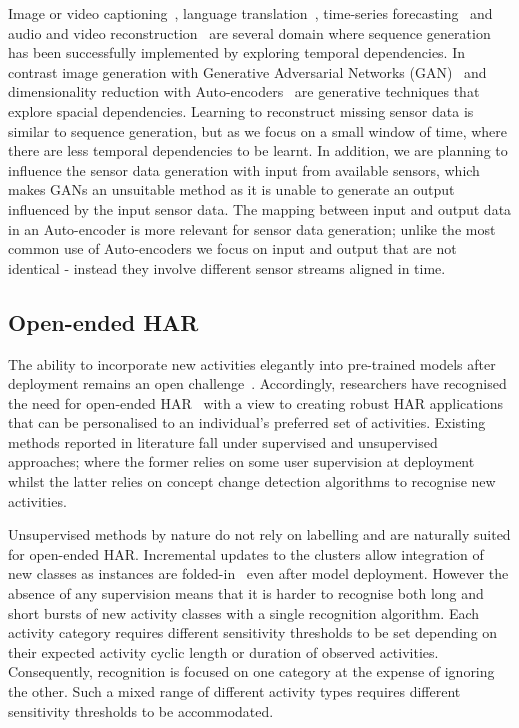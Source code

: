 \documentclass[runningheads]{llncs}
\begin{document}
Image or video captioning~\cite{yu2016video,vinyals2015show}, language translation~\cite{luong2015multi}, time-series forecasting~\cite{ma2015long} and audio and video reconstruction~\cite{ngiam2011multimodal} are several domain where sequence generation has been successfully implemented by exploring temporal dependencies. In contrast image generation with Generative Adversarial Networks (GAN)~\cite{goodfellow2014generative} and dimensionality reduction with Auto-encoders~\cite{vincent2010stacked} are generative techniques that explore spacial dependencies. Learning to reconstruct missing sensor data is similar to sequence generation, but as we focus on a small window of time, where there are less temporal dependencies to be learnt. In addition, we are planning to influence the sensor data generation with input from available sensors, which makes GANs an unsuitable method as it is unable to generate an output influenced by the input sensor data. The mapping between input and output data in an Auto-encoder is more relevant for sensor data generation; unlike the most common use of Auto-encoders we focus on input and output that are not identical - instead they involve different sensor streams aligned in time. 

\subsection{Open-ended HAR}
The ability to incorporate new activities elegantly into pre-trained models after deployment remains an open challenge~\cite{nweke2018deep}. Accordingly, researchers have recognised the need for open-ended HAR~\cite{kawaguchi20164} with a view to creating robust HAR applications that can be personalised to an individual’s preferred set of activities.
Existing methods reported in literature fall under supervised and unsupervised approaches; where the former relies on some user supervision at deployment whilst the latter relies on concept change detection algorithms to recognise new activities.

Unsupervised methods by nature do not rely on labelling and are naturally suited for open-ended HAR. Incremental updates to the clusters allow integration of new classes as instances are folded-in~\cite{gjoreski2017unsupervised} even after model deployment. However the absence of any supervision means that it is harder to recognise both long and short bursts of new activity classes with a single recognition algorithm. Each activity category requires different sensitivity thresholds to be set depending on their expected activity cyclic length or duration of observed activities. Consequently, recognition is focused on one category at the expense of ignoring the other. Such a mixed range of different activity types requires different sensitivity thresholds to be accommodated.
\end{document}
